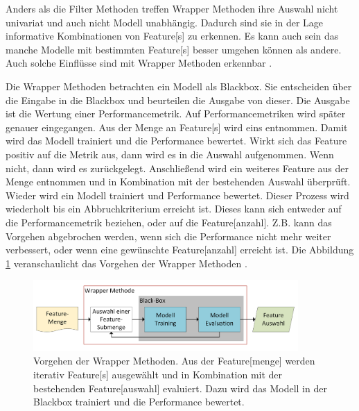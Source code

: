 Anders als die \gls{Filter Methoden} treffen \gls{Wrapper Methoden} ihre Auswahl nicht univariat und auch nicht Modell unabhängig. Dadurch sind sie in der Lage informative Kombinationen von \gls{Feature}[s] zu erkennen. Es kann auch sein das manche Modelle mit bestimmten \gls{Feature}[s] besser umgehen können als andere. Auch solche Einflüsse sind mit \gls{Wrapper Methoden} erkennbar \cite{Kuhn.2013, Guyon.2003}. \par

Die \gls{Wrapper Methoden} betrachten ein Modell als Blackbox. Sie entscheiden über die Eingabe in die Blackbox und beurteilen die Ausgabe von dieser. Die Ausgabe ist die Wertung einer Performancemetrik. Auf Performancemetriken wird später genauer eingegangen. Aus der Menge an \gls{Feature}[s] wird eins entnommen. Damit wird das Modell trainiert und die Performance bewertet. Wirkt sich das \gls{Feature} positiv auf die Metrik aus, dann wird es in die Auswahl aufgenommen. Wenn nicht, dann wird es zurückgelegt. Anschließend wird ein weiteres \gls{Feature} aus der Menge entnommen und in Kombination mit der bestehenden Auswahl überprüft. Wieder wird ein Modell trainiert und Performance bewertet. Dieser Prozess wird wiederholt bis ein Abbruchkriterium erreicht ist. Dieses kann sich entweder auf die Performancemetrik beziehen, oder auf die \gls{Feature}[anzahl]. Z.B. kann das Vorgehen abgebrochen werden, wenn sich die Performance nicht mehr weiter verbessert, oder wenn eine gewünschte \gls{Feature}[anzahl] erreicht ist. Die Abbildung \ref{fig:WrapMeth} veranschaulicht das Vorgehen der \gls{Wrapper Methoden} \cite{Kuhn.2013, Guyon.2003}.

\begin{figure}[htb]
    \centering
    \includegraphics[width=0.9\textwidth]{img/Grafiken/Wrapper Methode bsp.png}
    \caption[Vorgehen der Wrapper Methoden.]{Vorgehen der \gls{Wrapper Methoden}. Aus der \gls{Feature}[menge] werden iterativ \gls{Feature}[s] ausgewählt und in Kombination mit der bestehenden \gls{Feature}[auswahl] evaluiert. Dazu wird das Modell in der Blackbox trainiert und die Performance bewertet.}
    \label{fig:WrapMeth}
\end{figure}

